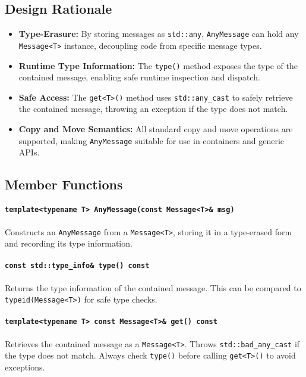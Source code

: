 \documentclass[12pt]{report}
\begin{document}
\subsection{Design Rationale}
\begin{itemize}
    \item \textbf{Type-Erasure:} By storing messages as \texttt{std::any}, \texttt{AnyMessage} can hold any \texttt{Message<T>} instance, decoupling code from specific message types.
    \item \textbf{Runtime Type Information:} The \texttt{type()} method exposes the type of the contained message, enabling safe runtime inspection and dispatch.
    \item \textbf{Safe Access:} The \texttt{get<T>()} method uses \texttt{std::any\_cast} to safely retrieve the contained message, throwing an exception if the type does not match.
    \item \textbf{Copy and Move Semantics:} All standard copy and move operations are supported, making \texttt{AnyMessage} suitable for use in containers and generic APIs.
\end{itemize}

\subsection{Member Functions}
\paragraph{\texttt{template<typename T> AnyMessage(const Message<T>\& msg)}}
Constructs an \texttt{AnyMessage} from a \texttt{Message<T>}, storing it in a type-erased form and recording its type information.

\paragraph{\texttt{const std::type\_info\& type() const}}
Returns the type information of the contained message. This can be compared to \texttt{typeid(Message<T>)} for safe type checks.

\paragraph{\texttt{template<typename T> const Message<T>\& get() const}}
Retrieves the contained message as a \texttt{Message<T>}. Throws \texttt{std::bad\_any\_cast} if the type does not match. Always check \texttt{type()} before calling \texttt{get<T>()} to avoid exceptions.
\end{document}
